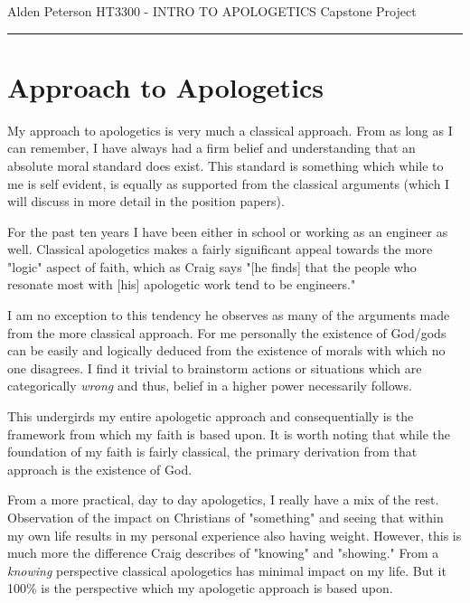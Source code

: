 \documentclass[12pt]{turabian-researchpaper}
\begin{document}
\begin{singlespace}
\noindent Alden Peterson \newline
\noindent HT3300 - INTRO TO APOLOGETICS \newline
\noindent Capstone Project \newline
\noindent\rule{4cm}{0.4pt}
\end{singlespace}

\setcounter{tocdepth}{4}

\tableofcontents
\newpage

\section{Approach to Apologetics}

My approach to apologetics is very much a classical approach. From as long as I can remember, I have always had a firm belief and understanding that an absolute moral standard does exist. This standard is something which while to me is self evident, is equally as supported from the classical arguments (which I will discuss in more detail in the position papers). 

For the past ten years I have been either in school or working as an engineer as well. Classical apologetics makes a fairly significant appeal towards the more "logic" aspect of faith, which as Craig says "[he finds] that the people who resonate most with [his] apologetic work tend to be engineers."\autocite[pg.22]{craig2008reasonable} 

I am no exception to this tendency he observes as many of the arguments made from the more classical approach. For me personally the existence of God/gods can be easily and logically deduced from the existence of morals with which no one disagrees. I find it trivial to brainstorm actions or situations which are categorically \textit{wrong} and thus, belief in a higher power necessarily follows.

This undergirds my entire apologetic approach and consequentially is the framework from which my faith is based upon. It is worth noting that while the foundation of my faith is fairly classical, the primary derivation from that approach is the existence of God. 

From a more practical, day to day apologetics, I really have a mix of the rest. Observation of the impact on Christians of "something" and seeing that within my own life results in my personal experience also having weight. However, this is much more the difference Craig describes of "knowing" and "showing." From a \textit{knowing} perspective classical apologetics has minimal impact on my life. But it 100\% is the perspective which my apologetic approach is based upon.
 
\end{document}
